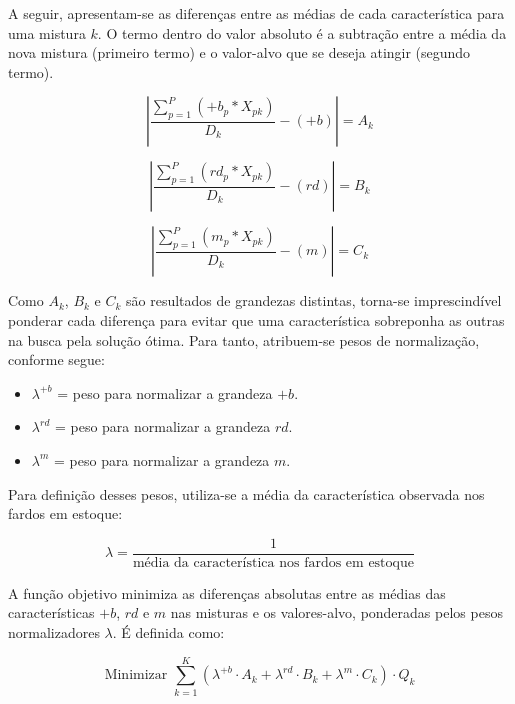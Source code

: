 \documentclass[
    12pt,                %
    openright,           %
    oneside,             %
    a4paper,             %
    english,             %
    spanish,             %
    brazil               %
]{ufscar}
\begin{document}
A seguir, apresentam-se as diferenças entre as médias de cada característica para uma mistura $k$. O termo dentro do valor absoluto é a subtração entre a média da nova mistura (primeiro termo) e o valor-alvo que se deseja atingir (segundo termo). 

\begin{equation}
\left| \frac{\sum_{p=1}^{P} (+b_p * X_{pk})}{D_k} - (+b) \right| = A_k 
\end{equation}

\begin{equation}
\left| \frac{\sum_{p=1}^{P} (rd_p * X_{pk})}{D_k} - (rd) \right| = B_k 
\end{equation}

\begin{equation}
\left| \frac{\sum_{p=1}^{P} (m_p * X_{pk})}{D_k} - (m) \right| = C_k 
\end{equation}

Como $A_k$, $B_k$ e $C_k$ são resultados de grandezas distintas, torna-se imprescindível ponderar cada diferença para evitar que uma característica sobreponha as outras na busca pela solução ótima. Para tanto, atribuem-se pesos de normalização, conforme segue:

\begin{itemize}
    \item $\lambda^{+b}$ = peso para normalizar a grandeza $+b$.
    \item $\lambda^{rd}$ = peso para normalizar a grandeza $rd$.
    \item $\lambda^{m}$ = peso para normalizar a grandeza $m$.
\end{itemize}

Para definição desses pesos, utiliza-se a média da característica observada nos fardos em estoque:

\begin{equation}
\lambda = \frac{1}{\text{média da característica nos fardos em estoque}} 
\end{equation}

A função objetivo minimiza as diferenças absolutas entre as médias das características $+b$, $rd$ e $m$ nas misturas e os valores-alvo, ponderadas pelos pesos normalizadores $\lambda$. É definida como:

\begin{equation}
\text{Minimizar } \sum_{k=1}^{K} \left( \lambda^{+b} \cdot A_k + \lambda^{rd} \cdot B_k + \lambda^{m} \cdot C_k \right) \cdot Q_k
\end{equation}
\end{document}
